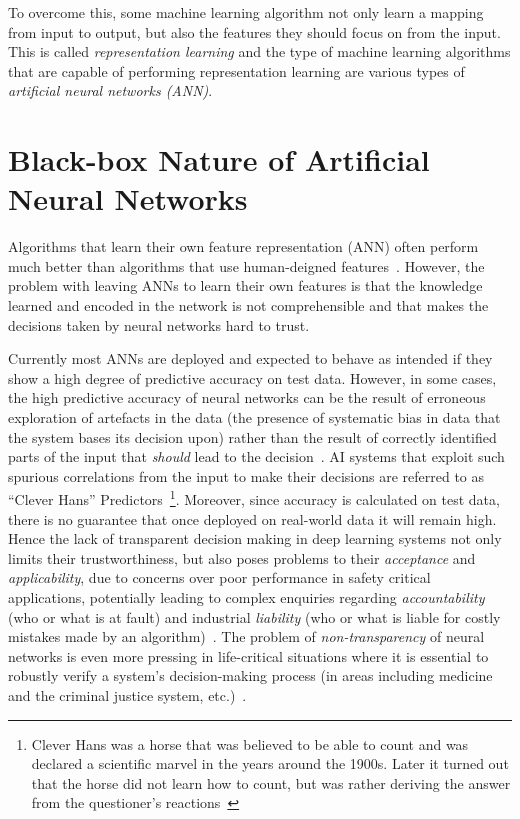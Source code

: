 To overcome this, some machine learning algorithm not only learn a mapping from input to output, but also the features they should focus on from the input. This is called \textit{representation learning} and the type of machine learning algorithms that are capable of performing representation learning are various types of \textit{artificial neural networks (ANN)}.  

\section{Black-box Nature of Artificial Neural Networks}

Algorithms that learn their own feature representation (\ie ANN) often perform much better than algorithms that use human-deigned features~\cite{goodfellow2016deep}. However, the problem with leaving ANNs to learn their own features is that the knowledge learned and encoded in the network is not comprehensible and that makes the decisions taken by neural networks hard to trust. 

Currently most ANNs are deployed and expected to behave as intended if they show a high degree of predictive accuracy on test data. However, in some cases, the high predictive accuracy of  neural networks can be the result of erroneous exploration of artefacts in the data (\ie the presence of systematic bias in data that the system bases its decision upon) rather than the result of correctly identified parts of the input that \textit{should} lead to the decision~\cite{leek2010tackling, SzegedyZSBEGF13, corr, taylor2006methods}. AI systems that exploit such spurious correlations from the input to make their decisions are referred to as ``Clever Hans'' Predictors~\footnote{Clever Hans was a horse that was believed to be able to count and was declared a scientific marvel in the years around the 1900s. Later it turned out that the horse did not learn how to count, but was rather deriving the answer from the questioner's reactions~\cite{lapuschkin2019unmasking}}. Moreover, since accuracy is calculated on test data, there is no guarantee that once deployed on real-world data it will remain high. Hence the lack of transparent decision making in deep learning systems not only limits their trustworthiness, but also poses problems to their \emph{acceptance} and \emph{applicability}, due to concerns over poor performance in safety critical applications, potentially leading to complex enquiries regarding \emph{accountability} (\ie who or what is at fault) and industrial \emph{liability} (\ie who or what is liable for costly mistakes made by an algorithm)~\cite{NguyenHHTK14, abs, kucharski2016study, WolfMG17}. The problem of \emph{non-transparency} of neural networks is even more pressing in life-critical situations where it is essential to robustly verify a system's decision-making process (\eg in areas including medicine and the criminal justice system, etc.)~\cite{CaruanaLGKSE15, BojarskiYCCFJM17}.

